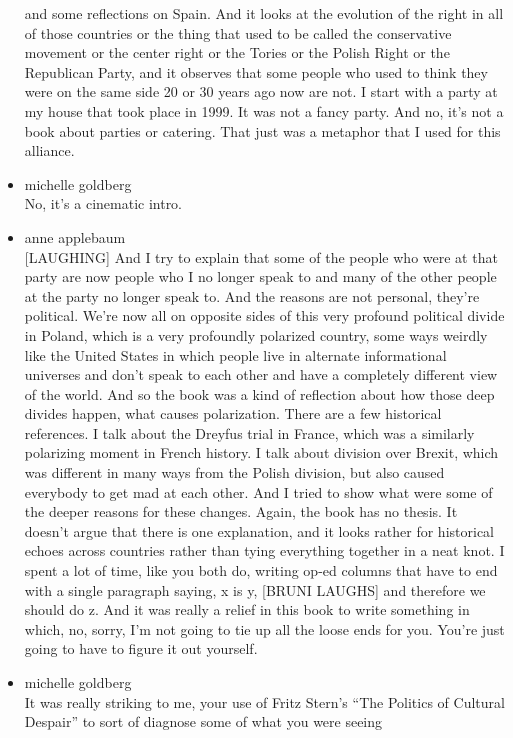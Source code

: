\begin{itemize}
  and some reflections on Spain. And it looks at the evolution of the
  right in all of those countries or the thing that used to be called
  the conservative movement or the center right or the Tories or the
  Polish Right or the Republican Party, and it observes that some people
  who used to think they were on the same side 20 or 30 years ago now
  are not. I start with a party at my house that took place in 1999. It
  was not a fancy party. And no, it's not a book about parties or
  catering. That just was a metaphor that I used for this alliance.
\item
  michelle goldberg\\
  No, it's a cinematic intro.
\item
  anne applebaum\\
  {[}LAUGHING{]} And I try to explain that some of the people who were
  at that party are now people who I no longer speak to and many of the
  other people at the party no longer speak to. And the reasons are not
  personal, they're political. We're now all on opposite sides of this
  very profound political divide in Poland, which is a very profoundly
  polarized country, some ways weirdly like the United States in which
  people live in alternate informational universes and don't speak to
  each other and have a completely different view of the world. And so
  the book was a kind of reflection about how those deep divides happen,
  what causes polarization. There are a few historical references. I
  talk about the Dreyfus trial in France, which was a similarly
  polarizing moment in French history. I talk about division over
  Brexit, which was different in many ways from the Polish division, but
  also caused everybody to get mad at each other. And I tried to show
  what were some of the deeper reasons for these changes. Again, the
  book has no thesis. It doesn't argue that there is one explanation,
  and it looks rather for historical echoes across countries rather than
  tying everything together in a neat knot. I spent a lot of time, like
  you both do, writing op-ed columns that have to end with a single
  paragraph saying, x is y, {[}BRUNI LAUGHS{]} and therefore we should
  do z. And it was really a relief in this book to write something in
  which, no, sorry, I'm not going to tie up all the loose ends for you.
  You're just going to have to figure it out yourself.
\item
  michelle goldberg\\
  It was really striking to me, your use of Fritz Stern's ``The Politics
  of Cultural Despair'' to sort of diagnose some of what you were seeing

\end{itemize}
